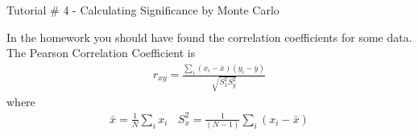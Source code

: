 \documentclass[11pt]{beamer}
\begin{document}


\begin{frame}
{\large Tutorial \# 4 - Calculating Significance by Monte Carlo}

In the homework you should have found the correlation coefficients for some data.  
The Pearson Correlation Coefficient is
\begin{align}
r_{xy} = \frac{ \sum_i (x_i - \bar{x} ) (y_i - \bar{y}) }{ \sqrt{ S^2_x S^2_y} }
\end{align}
where
\begin{align}
\bar{x} = \frac{1}{N}\sum_i x_i ~~~~ S^2_x = \frac{1}{(N-1)} \sum_i ( x_i - \bar{x} )
\end{align}
\end{frame}
\end{document}
